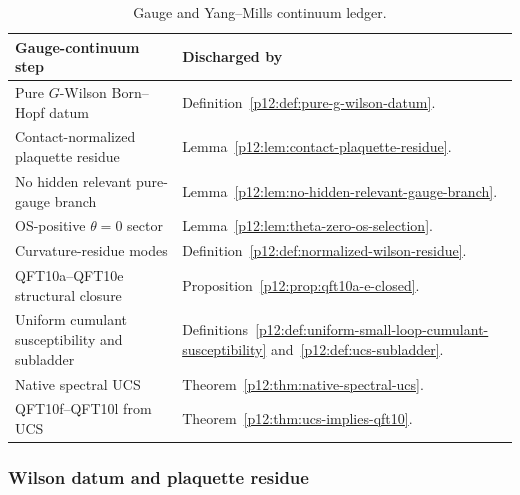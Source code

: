 \documentclass[12pt,a4paper]{article}
\begin{document}
\begin{table}[htbp]
\centering
\small
\begin{tabularx}{\textwidth}{@{}
>{\raggedright\arraybackslash}p{}
>{\raggedright\arraybackslash}X
@{}}
\toprule
\textbf{Gauge-continuum step} & \textbf{Discharged by} \\
\midrule
Pure \(G\)-Wilson Born--Hopf datum
& Definition~\ref{p12:def:pure-g-wilson-datum}. \\

Contact-normalized plaquette residue
& Lemma~\ref{p12:lem:contact-plaquette-residue}. \\

No hidden relevant pure-gauge branch
& Lemma~\ref{p12:lem:no-hidden-relevant-gauge-branch}. \\

OS-positive \(\theta=0\) sector
& Lemma~\ref{p12:lem:theta-zero-os-selection}. \\

Curvature-residue modes
& Definition~\ref{p12:def:normalized-wilson-residue}. \\

QFT10a--QFT10e structural closure
& Proposition~\ref{p12:prop:qft10a-e-closed}. \\

Uniform cumulant susceptibility and subladder
& Definitions~\ref{p12:def:uniform-small-loop-cumulant-susceptibility}
and~\ref{p12:def:ucs-subladder}. \\

Native spectral UCS
& Theorem~\ref{p12:thm:native-spectral-ucs}. \\

QFT10f--QFT10l from UCS
& Theorem~\ref{p12:thm:ucs-implies-qft10}. \\
\bottomrule
\end{tabularx}
\caption[Gauge and Yang--Mills continuum ledger]{Gauge and Yang--Mills continuum ledger.}
\label{p12:tab:gauge-ym-continuum-ledger}
\label{p12:tab:gauge-wilson-ledger}
\label{p12:tab:ym-continuum-ledger}
\end{table}


\subsubsection{Wilson datum and plaquette residue}
\label{p12:subsec:wilson-datum-plaquette-residue}
\end{document}
